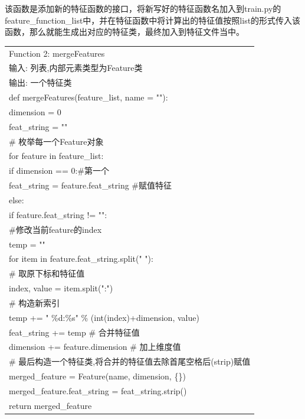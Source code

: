 \documentclass{mcmthesis}
\begin{document}
		\par 该函数是添加新的特征函数的接口，将新写好的特征函数名加入到train.py的feature\_function\_list中，并在特征函数中将计算出的特征值按照list的形式传入该函数，那么就能生成出对应的特征类，最终加入到特征文件当中。
		\hspace*{\fill} \\
		\begin{tabular}{l}
			\hline
			Function 2: mergeFeatures \\
			输入: 列表,内部元素类型为Feature类 \\
			输出: 一个特征类 \\
			\hline
			def mergeFeatures(feature\_list, name = ""): \\
			\qquad dimension = 0 \\
			\qquad feat\_string = "" \\
			
			\qquad \# 枚举每一个Feature对象 \\
			\qquad for feature in feature\_list: \\
			\qquad \qquad if dimension == 0:\#第一个 \\
			\qquad \qquad \qquad feat\_string = feature.feat\_string \#赋值特征 \\
			\qquad \qquad else: \\
			\qquad \qquad \qquad if feature.feat\_string != "": \\
			\qquad \qquad \qquad \qquad \#修改当前feature的index \\
			\qquad \qquad \qquad \qquad temp = "" \\
			\qquad \qquad \qquad \qquad for item in feature.feat\_string.split(" "): \\
			\qquad \qquad \qquad \qquad \qquad \# 取原下标和特征值 \\
			\qquad \qquad \qquad \qquad \qquad index, value = item.split(":") \\
			\qquad \qquad \qquad \qquad \qquad \# 构造新索引 \\
			\qquad \qquad \qquad \qquad \qquad temp += " \%d:\%s" \% (int(index)+dimension, value) \\
			\qquad \qquad \qquad \qquad feat\_string += temp \# 合并特征值 \\
			\qquad \qquad dimension += feature.dimension \# 加上维度值 \\
			\qquad \# 最后构造一个特征类,将合并的特征值去除首尾空格后(strip)赋值 \\
			\qquad merged\_feature = Feature(name, dimension, \{\}) \\
			\qquad merged\_feature.feat\_string = feat\_string.strip() \\
			\qquad return merged\_feature \\
			\hline
		\end{tabular}
\end{document}
